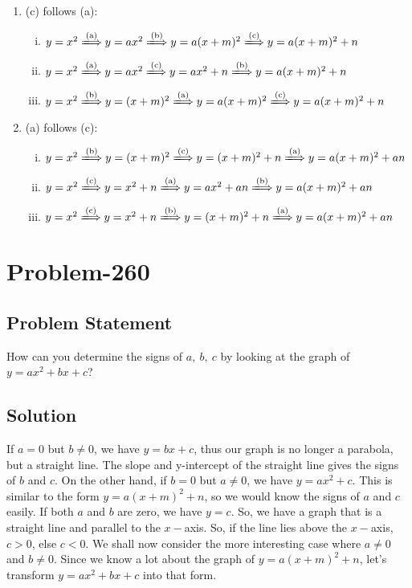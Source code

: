\documentclass[12pt]{article}
\begin{document}
\begin{enumerate}[1.]
	\item (c) follows (a):
		\begin{enumerate}[i.]
			\item $y=x^2 \xLongrightarrow{\text{(a)}} y = ax^2 \xLongrightarrow{\text{(b)}} y = a(x+m)^2 \xLongrightarrow{\text{(c)}} y = a(x+m)^2+n$
			\item $y=x^2 \xLongrightarrow{\text{(a)}} y=ax^2 \xLongrightarrow{\text{(c)}} y=ax^2 + n \xLongrightarrow{\text{(b)}} y=a(x+m)^2+n$
			\item $y=x^2 \xLongrightarrow{\text{(b)}} y=(x+m)^2 \xLongrightarrow{\text{(a)}} y=a(x+m)^2 \xLongrightarrow{\text{(c)}} y=a(x+m)^2+n$	
		\end{enumerate}
	\item (a) follows (c):
		\begin{enumerate}[i.]
			\item $y=x^2 \xLongrightarrow{\text{(b)}} y=(x+m)^2 \xLongrightarrow{\text{(c)}} y=(x+m)^2+n \xLongrightarrow{\text{(a)}} y=a(x+m)^2+an$
			\item $y=x^2 \xLongrightarrow{\text{(c)}} y=x^2+n \xLongrightarrow{\text{(a)}} y=ax^2+an \xLongrightarrow{\text{(b)}} y=a(x+m)^2+an$
			\item $y=x^2 \xLongrightarrow{\text{(c)}} y=x^2+n \xLongrightarrow{\text{(b)}} y=(x+m)^2+n \xLongrightarrow{\text{(a)}} y=a(x+m)^2+an$
		\end{enumerate}
\end{enumerate}

\section*{Problem-260}
\subsection*{Problem Statement}
How can you determine the signs of $a,\ b,\ c$ by looking at the graph of $y = ax^2+bx+c$?

\subsection{Solution}
If $a = 0$ but $b \neq 0$, we have $y = bx+c$, thus our graph is no longer a parabola, but a straight line. The slope and y-intercept of the straight line gives the signs of $b$ and $c$. On the other hand, if $b = 0$ but $a \neq 0$, we have $y = ax^2 + c$. This is similar to the form $y = a(x+m)^2+n$, so we would know the signs of $a$ and $c$ easily. If both $a$ and $b$ are zero, we have $y = c$. So, we have a graph that is a straight line and parallel to the $x-$axis. So, if the line lies above the $x-$axis, $c > 0$, else $c < 0$. 
We shall now consider the more interesting case where $a \neq 0$ and $b \neq 0$. Since we know a lot about the graph of $y = a(x+m)^2+n$, let's transform $y = ax^2 + bx + c$ into that form.
\end{document}
